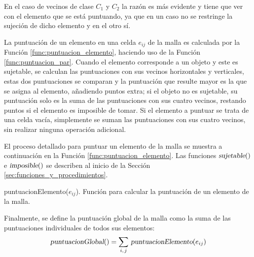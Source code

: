 En el caso de vecinos de clase $C_1$ y $C_2$ la razón es más evidente y tiene que ver con el elemento que se está puntuando, ya que en un caso no se restringe la sujeción de dicho elemento y en el otro sí.

La puntuación de un elemento en una celda $e_{ij}$ de la malla es calculada por la Función \ref{func:puntuacion_elemento}, haciendo uso de la Función \ref{func:puntuacion_par}.
Cuando el elemento corresponde a un objeto y este es sujetable, se calculan las puntuaciones con sus vecinos horizontales y verticales, estas dos puntuaciones se comparan y la puntuación que resulte mayor es la que se asigna al elemento, añadiendo puntos extra; si el objeto no es sujetable, su puntuación solo es la suma de las puntuaciones con sus cuatro vecinos, restando puntos si el elemento es imposible de tomar.
Si el elemento a puntuar se trata de una celda vacía, simplemente se suman las puntuaciones con sus cuatro vecinos, sin realizar ninguna operación adicional.

El proceso detallado para puntuar un elemento de la malla se muestra a continuación en la Función \ref{func:puntuacion_elemento}.
Las funciones $\textsl{sujetable}()$ e $\textsl{imposible}()$ se describen al inicio de la Sección \ref{sec:funciones_y_procedimientos}.
%
\begin{center}
\begin{minipage}{0.9\textwidth}
\begin{function}[H]
	\OneHalfBlankLine
	\OneHalfBlankLine
	\caption{puntuacionElemento($e_{ij}$). Función para calcular la puntuación de un elemento de la malla.}%
	\label{func:puntuacion_elemento}%
\end{function}
\end{minipage}
\end{center}
%
Finalmente, se define la puntuación global de la malla como la suma de las puntuaciones individuales de todos sus elementos:
%
\begin{equation}
\textsl{puntuacionGlobal}() = \sum_{i,\hspace{1pt} j}\, \textsl{puntuacionElemento}(e_{ij})
\end{equation}

